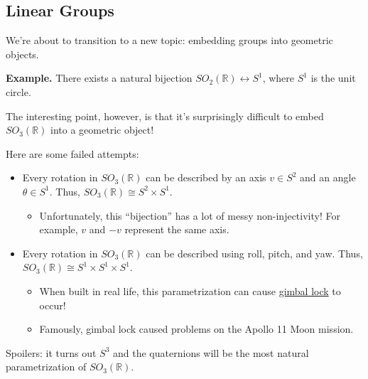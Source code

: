 




\subsection{Linear Groups}

We're about to transition to a new topic: embedding groups into geometric objects.

\textbf{Example.} There exists a natural bijection $SO_2(\mathbb{R}) \leftrightarrow S^1$, where $S^1$ is the unit circle.

The interesting point, however, is that it's surprisingly difficult to embed $SO_3(\mathbb{R})$ into a geometric object!

Here are some failed attempts:
\begin{itemize}
    \item Every rotation in $SO_3(\mathbb{R})$ can be described by an axis $v \in S^2$ and an angle $\theta \in S^1$.  Thus, $SO_3(\mathbb{R}) \cong S^2 \times S^1$.
    \begin{itemize}
        \item Unfortunately, this ``bijection'' has a lot of messy non-injectivity!  For example, $v$ and $-v$ represent the same axis.
    \end{itemize}
    \item Every rotation in $SO_3(\mathbb{R})$ can be described using roll, pitch, and yaw.  Thus, $SO_3(\mathbb{R}) \cong S^1 \times S^1 \times S^1$.
    \begin{itemize}
        \item When built in real life, this parametrization can cause \href{https://en.wikipedia.org/wiki/Gimbal_lock}{gimbal lock} to occur!
        \item Famously, gimbal lock caused problems on the Apollo 11 Moon mission.
    \end{itemize}
\end{itemize}
Spoilers: it turns out $S^3$ and the quaternions will be the most natural parametrization of $SO_3(\mathbb{R})$.

